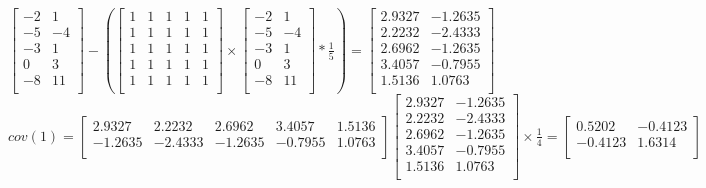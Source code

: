\documentclass[12pt]{article}
\begin{document}
\begin{center}
$
\begin{bmatrix}
-2 & 1\\
-5 & -4\\
-3 & 1\\
0 & 3\\
-8 & 11\\
\end{bmatrix}
-
\left(
\begin{bmatrix}
1 & 1 & 1 & 1 & 1\\
1 & 1 & 1 & 1 & 1\\
1 & 1 & 1 & 1 & 1\\
1 & 1 & 1 & 1 & 1\\
1 & 1 & 1 & 1 & 1\\
\end{bmatrix}
\times
\begin{bmatrix}
-2 & 1\\
-5 & -4\\
-3 & 1\\
0 & 3\\
-8 & 11\\
\end{bmatrix}
* \frac{1}{5}
\right)
=
\begin{bmatrix}
2.9327 & -1.2635\\
2.2232 &  -2.4333\\
2.6962 & -1.2635\\
3.4057 & -0.7955\\
1.5136 & 1.0763\\
\end{bmatrix}
$
\\[0.1 in]
$
cov(1) =
\begin{bmatrix}
2.9327 & 2.2232 & 2.6962 &   3.4057& 1.5136\\
-1.2635 & -2.4333 & -1.2635 &-0.7955 &   1.0763\\
\end{bmatrix}
\begin{bmatrix}
2.9327 & -1.2635\\
2.2232 & -2.4333\\
2.6962 &  -1.2635\\
3.4057 & -0.7955\\
1.5136 & 1.0763\\
\end{bmatrix}
\times \frac{1}{4}
=
\begin{bmatrix}
0.5202& -0.4123\\
-0.4123 & 1.6314\\
\end{bmatrix}
$
\end{center}
\end{document}

